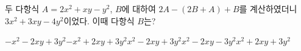 두 다항식 $A=2x^2+xy-y^2$, $B$에 대하여 $2A-(2B+A)+B$를 계산하였더니 $3x^2+3xy-4y^2$이었다. 이때 다항식 $B$는?
\begin{choicesii}{$-x^2-2xy+3y^2$}{$-x^2+2xy+3y^2$}{$x^2-2xy+3y^2$}{$x^2-2xy-3y^2$}{$x^2+2xy+3y^2$}\end{choicesii}

